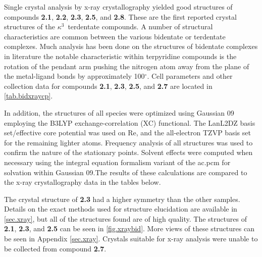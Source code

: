 Single crystal analysis by x-ray crystallography yielded good structures of compounds \textbf{2.1}, \textbf{2.2}, \textbf{2.3}, \textbf{2.5}, and \textbf{2.8}. These are the first reported crystal structures of the $\kappa^3$~terdentate  compounds. A number of structural characteristics are common between the various bidentate or terdentate complexes. Much analysis has been done on the structures of bidentate complexes in literature\autocite{anderson1990, civitello1993, kurz2006} the notable characteristic within terpyridine compounds is the rotation of the pendant arm pushing the nitrogen atom away from the plane of the metal-ligand bonds by approximately 100$^\circ$. Cell parameters and other collection data for compounds \textbf{2.1}, \textbf{2.3}, \textbf{2.5}, and \textbf{2.7} are located in \autoref{tab.bidxraycp}.



In addition, the structures of all species were optimized using Gaussian 09\autocite{gaussian} employing the B3LYP\autocite{becke1993, lee1988}  exchange-correlation (XC) functional. The LanL2DZ basis set/effective core potential\autocite{hay1985} was used on Re, and the all-electron TZVP basis set\autocite{schafer1994} for the remaining lighter atoms. Frequency analysis of all structures was used to confirm the nature of the stationary points. Solvent effects were computed when necessary using the integral equation formalism variant of the \gls{ac.pcm} for solvation within Gaussian 09\autocite{tomasi2005, scalmani2006}.The results of these calculations are compared to the x-ray crystallography data in the tables below.

The crystal structure of \textbf{2.3} had a higher symmetry than the other samples. Details on the exact methods used for structure elucidation are available in \autoref{sec.xray}, but all of the structures found are of high quality. The structures of \textbf{2.1}, \textbf{2.3}, and \textbf{2.5} can be seen in \autoref{fig.xraybid}. More views of these structures can be seen in Appendix \autoref{sec.xray}. Crystals suitable for x-ray analysis were unable to be collected from compound \textbf{2.7}. 

